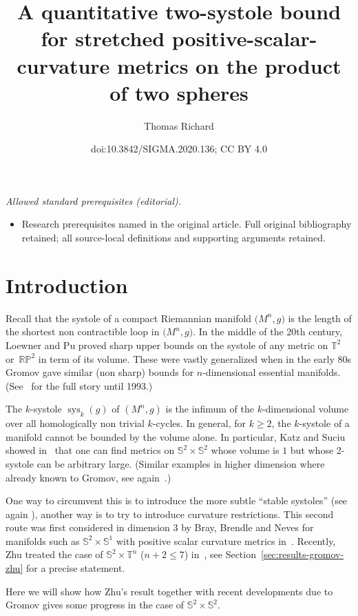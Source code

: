 \documentclass[10pt,a4paper]{amsart}
\title{A quantitative two-systole bound for stretched positive-scalar-curvature metrics on the product of two spheres}
\author{Thomas Richard}
\date{doi:10.3842/SIGMA.2020.136; CC BY 4.0}
\numberwithin{equation}{section}
\DeclareMathOperator{\sys}{sys}
\begin{document}
\maketitle
\noindent\textit{Allowed standard prerequisites (editorial).}\begin{itemize}
\item Research prerequisites named in the original article. Full original bibliography retained; all source-local definitions and supporting arguments retained.
\end{itemize}\medskip
\section{Introduction}

Recall that the systole of a compact Riemannian manifold $\big(M^n,g\big)$ is the
length of the shortest non contractible loop in $\big(M^n,g\big)$. In the
middle of the 20th century, Loewner and Pu proved sharp upper bounds
on the systole of any metric on $\mathbb{T}^2$ or~$\mathbb{RP}^2$ in
term of its volume.
These were vastly generalized when in the early 80s Gromov gave similar
(non sharp) bounds for $n$-dimensional essential manifolds. (See~\cite{berger1993systoles} for the full story until 1993.)

The $k$-systole $\sys_k(g)$ of $(M^n,g)$ is the infimum of the
$k$-dimensional volume over all homologically
non trivial $k$-cycles. In general, for
$k\geq 2$, the $k$-systole of a manifold cannot be bounded by the
volume alone. In particular, Katz and Suciu showed in~\cite{katz1999volume} that one can find
metrics on $\mathbb{S}^2\times\mathbb{S}^2$ whose volume is $1$ but
whose 2-systole can be arbitrary large. (Similar examples in higher
dimension where already known to Gromov, see again~\cite{berger1993systoles}.)

One way to circumvent this is to introduce the more subtle ``stable
systoles'' (see again \cite{berger1993systoles}), another way is to
try to introduce curvature restrictions. This second route was first
considered in dimension $3$ by Bray, Brendle and Neves for manifolds
such as $\mathbb{S}^2\times\mathbb{S}^1$ with positive scalar
curvature metrics in~\cite{bray2010rigidity}. Recently, Zhu treated the case of
$\mathbb{S}^2\times\mathbb{T}^n$ ($n+2\leq 7$) in~\cite{zhu2020rigidity}, see Section~\ref{sec:results-gromov-zhu} for a
precise statement.

Here we will show how Zhu's result together with recent developments
due to Gromov gives some progress in the case of $\mathbb{S}^2\times\mathbb{S}^2$.
\end{document}
